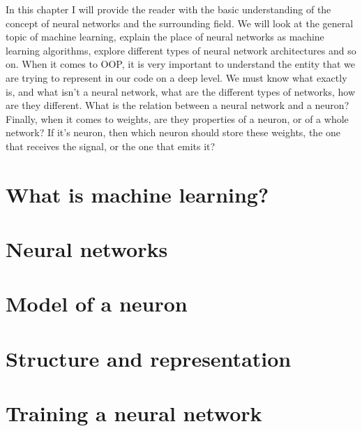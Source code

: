 In this chapter I will provide the reader with the basic understanding of the concept of neural networks and the surrounding field. We will look at the general topic of machine learning, explain the place of neural networks as machine learning algorithms, explore different types of neural network architectures and so on. When it comes to OOP, it is very important to understand the entity that we are trying to represent in our code on a deep level. We must know what exactly is, and what isn’t a neural network, what are the different types of networks, how are they different. What is the relation between a neural network and a neuron? Finally, when it comes to weights, are they properties of a neuron, or of a whole network? If it’s neuron, then which neuron should store these weights, the one that receives the signal, or the one that emits it?

\section{What is machine learning?}


\section{Neural networks}


\section{Model of a neuron}


\section{Structure and representation}


\section{Training a neural network}

